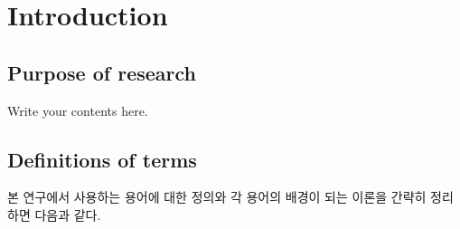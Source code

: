 \chapter{Introduction}
\setcounter{page}{1}
\section{Purpose of research}
\label{subsec:intro}
Write your contents here.

\section{Definitions of terms}
본 연구에서 사용하는 용어에 대한 정의와 각 용어의 배경이 되는 이론을 간략히 정리하면 다음과 같다.
